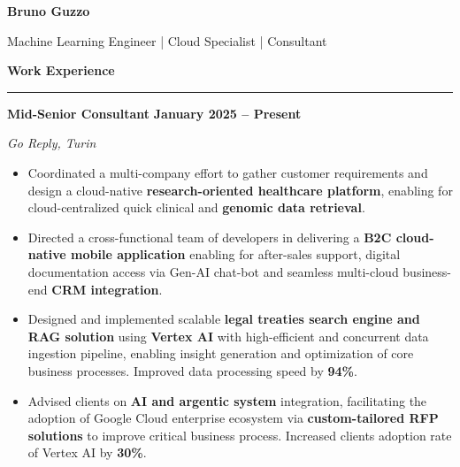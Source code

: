 \documentclass[9pt, a4paper]{article}
\newcommand{\cvsection}[1]{%
	\vspace{2pt}\par
	{\Large\bfseries\color{sectionblue}#1}\par
	\vspace{2pt}\hrule\vspace{6pt}
}
\newcommand{\cvsubsection}[3]{%
	\par {\large\bfseries #1} \hfill {\bfseries #2} \par {\textit{#3}} \vspace{4pt}
}
\begin{document}
	
	\begin{center}
		{\Huge\bfseries Bruno Guzzo}\par
		\vspace{4pt}
		{\Large Machine Learning Engineer | Cloud Specialist | Consultant}
	\end{center}
	
	\begin{minipage}[t]{0.70\linewidth}
		\vspace{0pt} %
		
		\cvsection{Work Experience}
		
		\cvsubsection{Mid-Senior Consultant}{January 2025 -- Present}{Go Reply, Turin}
		
		\begin{itemize}[leftmargin=*, nosep]
			\item \footnotesize Coordinated a multi-company effort to gather customer requirements and design a cloud-native \textbf{research-oriented healthcare platform}, enabling for cloud-centralized quick clinical and \textbf{genomic data retrieval}.     
			
			\vspace{2pt}
			\item \footnotesize Directed a cross-functional team of developers in delivering a \textbf{B2C cloud-native mobile application} enabling for after-sales support, digital documentation access via Gen-AI chat-bot and seamless multi-cloud business-end \textbf{CRM integration}.   
			
			\vspace{2pt}
			\item \footnotesize Designed and implemented scalable \textbf{legal treaties search engine and RAG solution} using \textbf{Vertex AI} with high-efficient and concurrent data ingestion pipeline, enabling insight generation and optimization of core business processes. 
			Improved data processing speed by \textbf{94\%}.  
			
			\vspace{2pt}		
			\item \footnotesize Advised clients on \textbf{AI and argentic system} integration, facilitating the adoption of Google Cloud enterprise ecosystem via \textbf{custom-tailored RFP solutions} to improve critical business process.
			Increased clients adoption rate of Vertex AI by \textbf{30\%}.  
			

\end{itemize}
\end{minipage}
\end{document}
